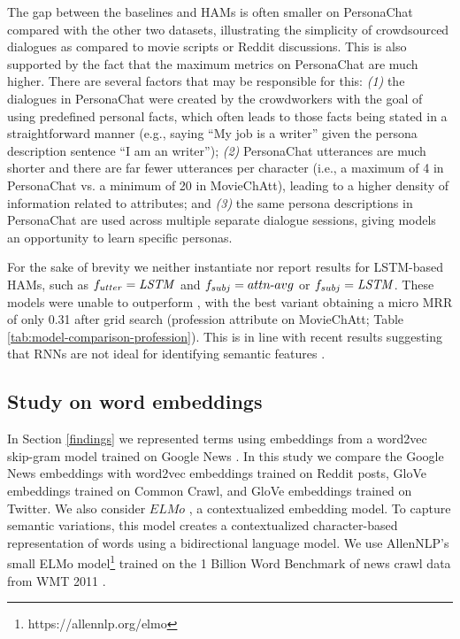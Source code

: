 The gap between the baselines and HAMs is often smaller on PersonaChat compared with the other two datasets, illustrating the simplicity of crowdsourced dialogues as compared to movie scripts or Reddit discussions. This is also supported by the fact that the maximum metrics on PersonaChat are much higher. There are several factors that may be responsible for this: \textit{(1)} the dialogues in PersonaChat were created by the crowdworkers with the goal of using predefined personal facts, which often leads to those facts being stated in a straightforward manner (e.g., saying ``My job is a writer'' given the persona description sentence ``I am an writer''); \textit{(2)} PersonaChat utterances are much shorter 
and there are far fewer utterances per character (i.e., a maximum of 4 in PersonaChat vs. a minimum of 20 in MovieChAtt), leading to a higher density of information related to attributes; and \textit{(3)} the same persona descriptions in PersonaChat are used across multiple separate dialogue sessions, giving models an opportunity to learn specific personas.

For the sake of brevity we neither instantiate nor report results for LSTM-based HAMs, such as $f_{utter}=\text{\textit{LSTM}}$ and $f_{subj}=attn{\text -}avg$ or $f_{subj}=\text{\textit{LSTM}}$. These models were unable to outperform , with the best variant obtaining a micro MRR of only 0.31 after grid search (profession attribute on MovieChAtt; Table \ref{tab:model-comparison-profession}). This is in line with recent results suggesting that RNNs are not ideal for identifying semantic features \cite{tang2018self}.




\subsection{Study on word embeddings}
In Section \ref{findings} we represented terms using embeddings from a word2vec skip-gram model trained on Google News \cite{embed1}.
In this study we compare the Google News embeddings with word2vec embeddings trained on Reddit posts, GloVe \cite{pennington2014glove} embeddings trained on Common Crawl, and GloVe embeddings trained on Twitter. We also consider $ELMo$ \cite{Peters:2018}, a contextualized embedding model. To capture semantic variations, this model creates a contextualized character-based representation of words using a bidirectional language model. We use AllenNLP's small ELMo model\footnote{https://allennlp.org/elmo} trained on the 1 Billion Word Benchmark of news crawl data from WMT 2011 \cite{41880}. 


